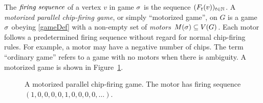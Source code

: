 The $\emph{firing sequence}$ of a vertex $v$ in game $\sigma$ is the sequence
$(\firing{v}{t})_{t \in \nats}$. A \emph{motorized parallel chip-firing game},
or simply ``motorized game'', on $G$ is a game $\sigma$ obeying \eqref{gameDef}
with a non-empty set of \emph{motors} $M(\sigma) \subseteq V(G)$. Each motor follows
a predetermined firing sequence without regard for normal chip-firing
rules. For example, a motor may have a negative number of chips. The term
``ordinary game'' refers to a game with no motors when there is ambiguity. A
motorized game is shown in Figure~\ref{motorizedTreeNoGlider}.
\begin{figure}
  \centering
  \caption{A motorized parallel chip-firing game. The motor has firing sequence
    $(1,0,0,0,0,1,0,0,0,0,\dots)$.}
  \label{motorizedTreeNoGlider}
\end{figure}


